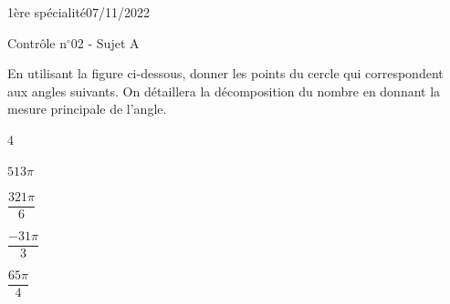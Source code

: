 \documentclass[a4paper,12pt]{article}        %
\begin{document}
\pagestyle{empty}
\vspace*{-1.5cm}
1ère spécialité\phantom{xxxxxxxxxxxxxxxxxxxxxxxxxxxxxxxxxxxxxxxxxxxxxxxxxxxxxxxxxxxxxxx}07/11/2022
{\begin{center}\Huge{Contrôle n$^{\circ}$02 - Sujet A}\end{center}}


En utilisant la figure ci-dessous, donner les points du cercle qui correspondent aux angles suivants. On détaillera la décomposition du nombre en donnant la mesure principale de l'angle.
\begin{multicols}{4}
\begin{enumMet}
    \item $513\pi$
    \item $\dfrac{321\pi}{6}$
    \item $\dfrac{-31\pi}{3}$
    \item $\dfrac{65\pi}{4}$
\end{enumMet}
\end{multicols}
\end{document}
